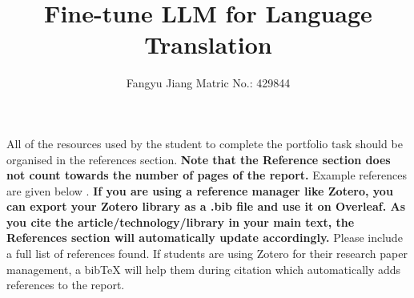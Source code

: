 \documentclass[]{reflection}
\title{Fine-tune LLM for Language Translation}
\author{Fangyu Jiang \quad Matric No.: 429844
  \institute{RPTU Kaiserslautern, Department of Computer Science}}
\begin{document}

\maketitle








\newpage
All of the resources used by the student to complete the portfolio task should be organised in the references section. 
\textbf {Note that the Reference section does not count towards the number of pages of the report.} Example references are given below \cite{einstein}\cite{knuthwebsite}\cite{latexcompanion}. \textbf{ If you are using a reference manager like Zotero, you can export your Zotero library as a .bib file and use it on Overleaf. As you cite the article/technology/library in your main text, the References section will automatically update accordingly.} Please include a full list of references found. If students are using Zotero for their research paper management, a bibTeX will help them during citation which automatically adds references to the report.  

\medskip



\end{document}
